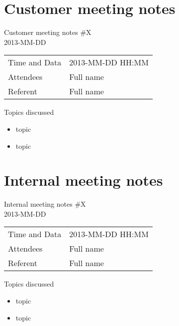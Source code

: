 \clearpage
\section{Customer meeting notes}

\begin{center}
Customer meeting notes \#X \\
2013-MM-DD \\
\end{center}

\begin{table}[H]
\begin{center}
\begin{tabular}{ l | l }
Time and Data & 2013-MM-DD HH:MM \\
Attendees & Full name \\
Referent & Full name \\
\end{tabular}
\end{center}
\end{table}

Topics discussed
\begin{itemize}
\item topic
\item topic
\end{itemize}

\clearpage
\section{Internal meeting notes}

\begin{center}
Internal meeting notes \#X \\
2013-MM-DD \\
\end{center}

\begin{table}[H]
\begin{center}
\begin{tabular}{ l | l }
Time and Data & 2013-MM-DD HH:MM \\
Attendees & Full name \\
Referent & Full name \\
\end{tabular}
\end{center}
\end{table}

Topics discussed
\begin{itemize}
\item topic
\item topic
\end{itemize}